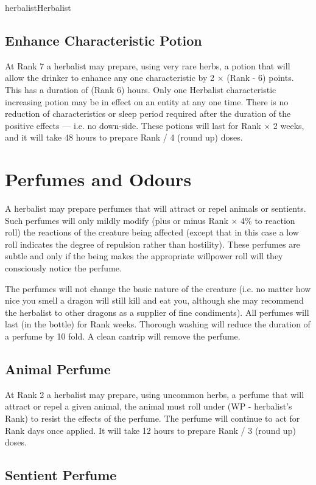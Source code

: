 \begin{Skill}[1.1]{herbalist}{Herbalist}
\subsection{Enhance Characteristic Potion}

At Rank 7 a herbalist may prepare, using very rare herbs, a potion
that will allow the drinker to enhance any one characteristic by 2 ×
(Rank - 6) points. This has a duration of (Rank 6) hours. Only one
Herbalist characteristic increasing potion may be in effect on an
entity at any one time.  There is no reduction of characteristics or
sleep period required after the duration of the positive effects —
i.e. no down-side.  These potions will last for Rank × 2 weeks, and it
will take 48 hours to prepare Rank / 4 (round up) doses.

\section{Perfumes and Odours}

A herbalist may prepare perfumes that will attract or repel animals or
sentients.  Such perfumes will only mildly modify (plus or minus Rank
× 4\% to reaction roll) the reactions of the creature being affected
(except that in this case a low roll indicates the degree of
repulsion rather than hostility).  These perfumes are subtle and only
if the being makes the appropriate willpower roll will they
consciously notice the perfume.

The perfumes will not change the basic nature of the creature (i.e.
no matter how nice you smell a dragon will still kill and eat you,
although she may recommend the herbalist to other dragons as a
supplier of fine condiments). All perfumes will last (in the bottle)
for Rank weeks.  Thorough washing will reduce the duration of a
perfume by 10 fold. A clean cantrip will remove the perfume.

\subsection{Animal Perfume}

At Rank 2 a herbalist may prepare, using uncommon herbs, a perfume
that will attract or repel a given animal, the animal must roll under
(WP - herbalist’s Rank) to resist the effects of the perfume.  The
perfume will continue to act for Rank days once applied.  It will take
12 hours to prepare Rank / 3 (round up) doses.

\subsection{Sentient Perfume}


\end{Skill}
